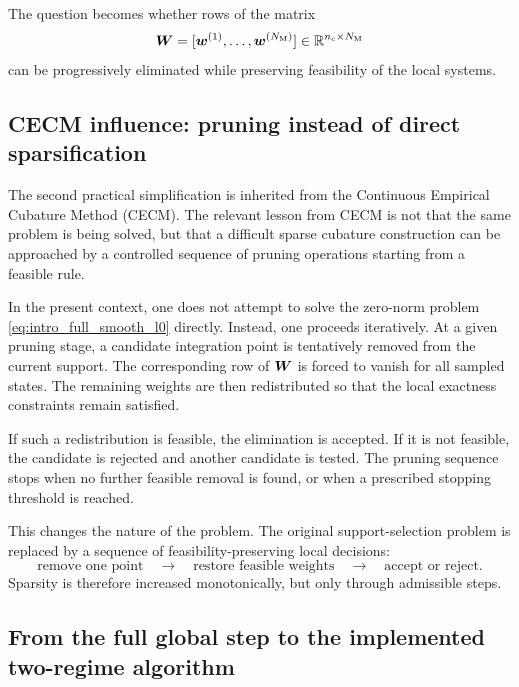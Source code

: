 \documentclass[11pt,a4paper]{article}
\begin{document}
The question becomes whether rows of the matrix
\[
        \bm W =
        [\bm w^{(1)},\ldots,\bm w^{(N_{\mathrm{M}})}]
        \in\mathbb{R}^{n_{\mathrm{c}}\times N_{\mathrm{M}}}
\]
can be progressively eliminated while preserving feasibility of the local
systems.

\subsection{CECM influence: pruning instead of direct sparsification}

The second practical simplification is inherited from the Continuous Empirical
Cubature Method (CECM). The relevant lesson from CECM is not that the same
problem is being solved, but that a difficult sparse cubature construction can
be approached by a controlled sequence of pruning operations starting from a
feasible rule.

In the present context, one does not attempt to solve the zero-norm problem
\eqref{eq:intro_full_smooth_l0} directly. Instead, one proceeds iteratively.
At a given pruning stage, a candidate integration point is tentatively removed
from the current support. The corresponding row of $\bm W$ is forced to
vanish for all sampled states. The remaining weights are then redistributed so
that the local exactness constraints remain satisfied.

If such a redistribution is feasible, the elimination is accepted. If it is not
feasible, the candidate is rejected and another candidate is tested. The pruning
sequence stops when no further feasible removal is found, or when a prescribed
stopping threshold is reached.

This changes the nature of the problem. The original support-selection problem
is replaced by a sequence of feasibility-preserving local decisions:
\[
        \text{remove one point}
        \quad\longrightarrow\quad
        \text{restore feasible weights}
        \quad\longrightarrow\quad
        \text{accept or reject}.
\]
Sparsity is therefore increased monotonically, but only through admissible
steps.

\subsection{From the full global step to the implemented two-regime algorithm}
\end{document}
